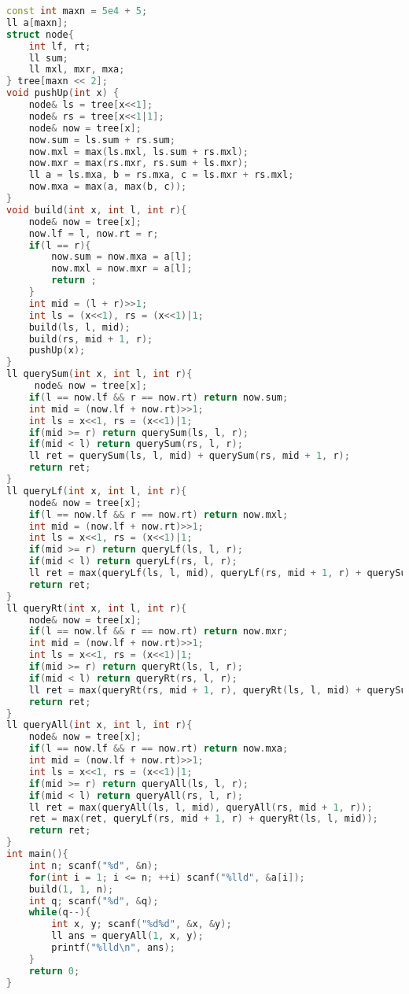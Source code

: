 \begin{lstlisting}[language=C++]
const int maxn = 5e4 + 5;
ll a[maxn];
struct node{
    int lf, rt;
    ll sum;
    ll mxl, mxr, mxa;
} tree[maxn << 2];
void pushUp(int x) {
    node& ls = tree[x<<1];
    node& rs = tree[x<<1|1];
    node& now = tree[x];
    now.sum = ls.sum + rs.sum;
    now.mxl = max(ls.mxl, ls.sum + rs.mxl);
    now.mxr = max(rs.mxr, rs.sum + ls.mxr);
    ll a = ls.mxa, b = rs.mxa, c = ls.mxr + rs.mxl;
    now.mxa = max(a, max(b, c));
}
void build(int x, int l, int r){
    node& now = tree[x];
    now.lf = l, now.rt = r;
    if(l == r){
        now.sum = now.mxa = a[l];
        now.mxl = now.mxr = a[l];
        return ;
    }
    int mid = (l + r)>>1;
    int ls = (x<<1), rs = (x<<1)|1;
    build(ls, l, mid);
    build(rs, mid + 1, r);
    pushUp(x);
}
ll querySum(int x, int l, int r){
     node& now = tree[x];
    if(l == now.lf && r == now.rt) return now.sum;
    int mid = (now.lf + now.rt)>>1;
    int ls = x<<1, rs = (x<<1)|1;
    if(mid >= r) return querySum(ls, l, r);
    if(mid < l) return querySum(rs, l, r);
    ll ret = querySum(ls, l, mid) + querySum(rs, mid + 1, r);
    return ret;
}
ll queryLf(int x, int l, int r){
    node& now = tree[x];
    if(l == now.lf && r == now.rt) return now.mxl;
    int mid = (now.lf + now.rt)>>1;
    int ls = x<<1, rs = (x<<1)|1;
    if(mid >= r) return queryLf(ls, l, r);
    if(mid < l) return queryLf(rs, l, r);
    ll ret = max(queryLf(ls, l, mid), queryLf(rs, mid + 1, r) + querySum(ls, l, mid));
    return ret;
}
ll queryRt(int x, int l, int r){
    node& now = tree[x];
    if(l == now.lf && r == now.rt) return now.mxr;
    int mid = (now.lf + now.rt)>>1;
    int ls = x<<1, rs = (x<<1)|1;
    if(mid >= r) return queryRt(ls, l, r);
    if(mid < l) return queryRt(rs, l, r);
    ll ret = max(queryRt(rs, mid + 1, r), queryRt(ls, l, mid) + querySum(rs, mid + 1, r));
    return ret;
}
ll queryAll(int x, int l, int r){
    node& now = tree[x];
    if(l == now.lf && r == now.rt) return now.mxa;
    int mid = (now.lf + now.rt)>>1;
    int ls = x<<1, rs = (x<<1)|1;
    if(mid >= r) return queryAll(ls, l, r);
    if(mid < l) return queryAll(rs, l, r);
    ll ret = max(queryAll(ls, l, mid), queryAll(rs, mid + 1, r));
    ret = max(ret, queryLf(rs, mid + 1, r) + queryRt(ls, l, mid));
    return ret;
}
int main(){
    int n; scanf("%d", &n);
    for(int i = 1; i <= n; ++i) scanf("%lld", &a[i]);
    build(1, 1, n);
    int q; scanf("%d", &q);
    while(q--){
        int x, y; scanf("%d%d", &x, &y);
        ll ans = queryAll(1, x, y);
        printf("%lld\n", ans);
    }
    return 0;
}
\end{lstlisting}

